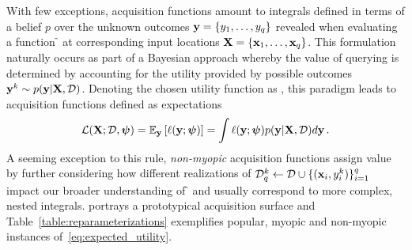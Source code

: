 With few exceptions, acquisition functions amount to integrals defined in terms of a belief \(p\) over the unknown outcomes \(\mathbf{y} = \{y_{1},\ldots,y_{q}\}\) revealed when evaluating a \blackbox{} function \f{} at corresponding input locations \(\mathbf{X} = \{\mathbf{x}_{1},\ldots,\mathbf{x}_{q}\}\). 
%
This formulation naturally occurs as part of a Bayesian approach whereby the value of querying \X{} is determined by accounting for the utility provided by possible outcomes \(\mathbf{y}^{k} \sim p(\mathbf{y}|\mathbf{X}, \mathcal{D})\). 
% 
Denoting the chosen utility function as \acq{}, this paradigm leads to acquisition functions defined as expectations
\begin{align}
\mathcal{L}(\mathbf{X}; \mathcal{D}, \boldsymbol{\psi})
	= \mathbb{E}_{\mathbf{y}}\left[\ell(\mathbf{y}; \boldsymbol{\psi})\right]
	= \int \ell(\mathbf{y}; \boldsymbol{\psi}) p(\mathbf{y}|\mathbf{X}, \mathcal{D}{}) d\mathbf{y}\,.
\label{eq:expected_utility}
\end{align}
A seeming exception to this rule, \emph{non-myopic} acquisition functions assign value by further considering how different realizations of \(\mathcal{D}^{k}_{q} \gets \mathcal{D} \cup \{(\mathbf{x}_{i},y^{k}_{i})\}_{i=1}^{q}\) impact our broader understanding of \f{} and usually correspond to more complex, nested integrals.  portrays a prototypical acquisition surface and Table~\ref{table:reparameterizations} exemplifies popular, myopic and non-myopic instances of~\eqref{eq:expected_utility}.
%
\begin{table}
\begin{center}

\captionsetup{width=1.0\textwidth}
\vspace{4pt}
\caption{
% 
Examples of reparameterizable acquisition functions; the final column indicates whether they belong to the \MM{} family (Section~\ref{sect:myopic_maximal}). 
% 
Glossary: \(\heaviside^{+/-}\) denotes the right-/left-continuous Heaviside step function; \relu{} and \sigmoid{} rectified linear and sigmoid nonlinearities, respectively; \entropy{} the Shannon entropy; \(\alpha\) an improvement threshold; \(\tau\) a temperature parameter; \(\Chol\T{\Chol} \triangleq \Cov\) the Cholesky factor; and, residuals \(\resids \sim \gaussian\left(\zeros, \Cov\right)\). Lastly, non-myopic acquisition function (\ES{} and \KG) are assumed to be defined using a discretization. Terms associated with the query set and discretization are respectively denoted via subscripts \(a\) and \(b\).}
\label{table:reparameterizations}
\end{center}
\vspace{-12pt}
\end{table}
